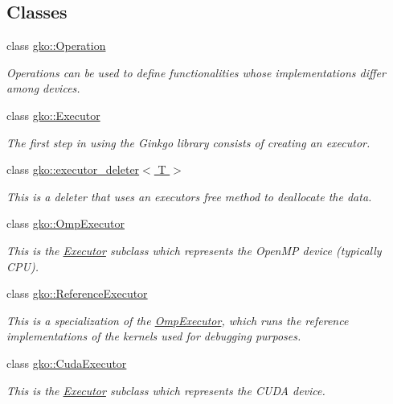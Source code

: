 \subsection*{Classes}
\begin{DoxyCompactItemize}
\item 
class \hyperlink{classgko_1_1Operation}{gko\+::\+Operation}
\begin{DoxyCompactList}\small\item\em Operations can be used to define functionalities whose implementations differ among devices. \end{DoxyCompactList}\item 
class \hyperlink{classgko_1_1Executor}{gko\+::\+Executor}
\begin{DoxyCompactList}\small\item\em The first step in using the Ginkgo library consists of creating an executor. \end{DoxyCompactList}\item 
class \hyperlink{classgko_1_1executor__deleter}{gko\+::executor\+\_\+deleter$<$ T $>$}
\begin{DoxyCompactList}\small\item\em This is a deleter that uses an executor\textquotesingle{}s {\ttfamily free} method to deallocate the data. \end{DoxyCompactList}\item 
class \hyperlink{classgko_1_1OmpExecutor}{gko\+::\+Omp\+Executor}
\begin{DoxyCompactList}\small\item\em This is the \hyperlink{classgko_1_1Executor}{Executor} subclass which represents the Open\+MP device (typically C\+PU). \end{DoxyCompactList}\item 
class \hyperlink{classgko_1_1ReferenceExecutor}{gko\+::\+Reference\+Executor}
\begin{DoxyCompactList}\small\item\em This is a specialization of the \hyperlink{classgko_1_1OmpExecutor}{Omp\+Executor}, which runs the reference implementations of the kernels used for debugging purposes. \end{DoxyCompactList}\item 
class \hyperlink{classgko_1_1CudaExecutor}{gko\+::\+Cuda\+Executor}
\begin{DoxyCompactList}\small\item\em This is the \hyperlink{classgko_1_1Executor}{Executor} subclass which represents the C\+U\+DA device. \end{DoxyCompactList}\end{DoxyCompactItemize}
